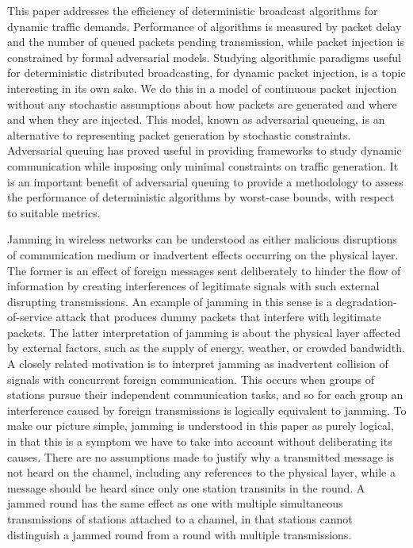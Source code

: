 \documentclass[11pt]{article}
\begin{document}
This paper addresses the efficiency of deterministic broadcast algorithms for dynamic traffic demands.
Performance of algorithms is measured by packet delay and the number of queued packets pending transmission, while packet injection is constrained by formal adversarial models.
Studying algorithmic paradigms useful for deterministic distributed broadcasting, for dynamic  packet injection, is a topic interesting in its own sake. 
We do this in a model of continuous packet injection without any stochastic assumptions about how packets are generated and where and when they are injected.
This model, known as adversarial queueing, is an alternative to representing packet generation by stochastic constraints.
Adversarial queuing has proved useful in providing frameworks to study dynamic communication  while imposing only minimal constraints on traffic generation.
It is an important benefit of adversarial queuing to provide a methodology to assess the performance of deterministic algorithms by worst-case bounds, with respect to suitable metrics. 

Jamming in wireless networks can be understood as either malicious disruptions of communication medium or inadvertent effects occurring on the physical layer.
The former is an effect of foreign messages sent deliberately to hinder the flow of information by creating interferences of legitimate signals with such external disrupting transmissions.
An example of jamming in this sense is a degradation-of-service attack that produces dummy packets that interfere with legitimate packets.
The latter interpretation of jamming is about the physical layer affected by external factors, such as the supply of energy, weather, or crowded bandwidth.
A closely related motivation is to interpret jamming as inadvertent collision of signals with concurrent foreign communication.
This occurs when groups of stations pursue their independent communication tasks, and so for each group an interference caused by foreign transmissions is logically equivalent to jamming.
To make our picture simple, jamming is understood in this paper as purely logical, in that this is a symptom we have to take into account without deliberating its causes. 
There are no assumptions made to justify why a transmitted message is not heard on the channel, including any references to the physical layer, while a message should be heard since only one station transmits in the round. 
A jammed round has the same effect as one with multiple simultaneous transmissions of stations attached to a channel, in that stations cannot distinguish a jammed round from a round with multiple transmissions.
\end{document}
